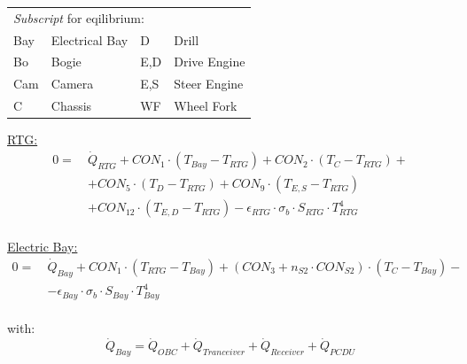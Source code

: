 \begin{table}[H]
	\begin{tabular}{l@{\quad}l@{\qquad\qquad\qquad}l@{\quad}l}
		\multicolumn{4}{l}{\textit{Subscript} for eqilibrium:}\\[0.5em]
		Bay & Electrical Bay & D	& Drill\\
		Bo & Bogie & 	E,D & Drive Engine\\
		Cam & Camera & E,S & Steer Engine\\
		C & Chassis & WF & Wheel Fork\\
	\end{tabular}

\end{table}

\underline{RTG:}
\begin{equation}
\begin{aligned}
0=\  &\dot{Q}_{RTG} +CON_1 \cdot (T_{Bay}-T_{RTG})+CON_2 \cdot (T_{C}-T_{RTG})+ \\[1em]
& + CON_5 \cdot (T_{D}-T_{RTG})+ CON_9 \cdot (T_{E,S}-T_{RTG})\\[1em]
& +   CON_12 \cdot (T_{E,D}-T_{RTG}) - \epsilon_{RTG}\cdot \sigma_b \cdot S_{RTG}\cdot T_{RTG}^4 \\[2em]
\end{aligned}
\end{equation}

\underline{Electric Bay:}
\begin{equation}
	\begin{aligned}
		0=\ &  \dot{Q}_{Bay}+ CON_1 \cdot (T_{RTG}-T_{Bay})+ (CON_3+n_{S2}\cdot CON_{S2}) \cdot (T_{C}-T_{Bay})-\\[1em]
		&  -\epsilon_{Bay}\cdot \sigma_b \cdot S_{Bay}\cdot T_{Bay}^4
	\end{aligned}
\end{equation}\\
with: 
\begin{equation} \dot{Q}_{Bay} = \dot{Q}_{OBC} + \dot{Q}_{Tranceiver} +\dot{Q}_{Receiver} +\dot{Q}_{PCDU} \end{equation}\\

